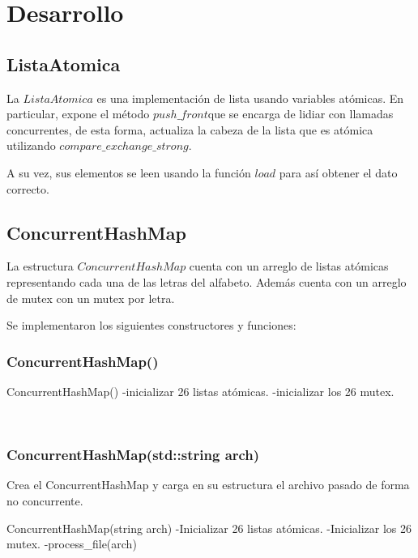 \section{Desarrollo}

\subsection{ListaAtomica}

La $ListaAtomica$ es una implementación de lista usando variables atómicas. En particular, expone el método $push\_front$que se encarga de lidiar con llamadas concurrentes, de esta forma, actualiza la cabeza de la lista que es atómica utilizando $compare\_exchange\_strong$.

A su vez, sus elementos se leen usando la función $load$ para así obtener el dato correcto.

\subsection{ConcurrentHashMap}

La estructura $ConcurrentHashMap$ cuenta con un arreglo de listas atómicas representando cada una de las letras del alfabeto. Además cuenta con un arreglo de mutex con un mutex por letra. 

Se implementaron los siguientes constructores y funciones:\\

\subsubsection{ConcurrentHashMap()}
\begin{codesnippet}
ConcurrentHashMap()
 	-inicializar 26 listas atómicas.
 	-inicializar los 26 mutex.
\end{codesnippet}\\

\subsubsection{ConcurrentHashMap(std::string arch)}
Crea el ConcurrentHashMap y carga en su estructura el archivo pasado de forma no concurrente.\\
\begin{codesnippet}
ConcurrentHashMap(string arch)
 	-Inicializar 26 listas atómicas.
 	-Inicializar los 26 mutex.
 	-process_file(arch)
\end{codesnippet}\\

